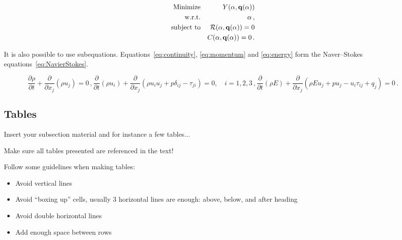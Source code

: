 \begin{eqnarray}
  {\rm Minimize}   && Y({\bf \alpha},{\bf q}({\bf \alpha}))            \nonumber           \\
  {\rm w.r.t.}     && {\bf \alpha} \,,                                 \label{eq:minimize} \\
  {\rm subject~to} && {\cal R}({\bf \alpha},{\bf q}({\bf \alpha})) = 0 \nonumber           \\
                   &&       C ({\bf \alpha},{\bf q}({\bf \alpha})) = 0 \,. \nonumber
\end{eqnarray}

It is also possible to use subequations. Equations~\ref{eq:continuity}, \ref{eq:momentum} and \ref{eq:energy} form the Naver--Stokes equations~\ref{eq:NavierStokes}.

\begin{subequations}
    \begin{equation}
    \frac{\partial \rho}{\partial t} + \frac{\partial}{\partial x_j}\left( \rho u_j \right) = 0 \,,
    \label{eq:continuity}
    \end{equation}
    \begin{equation}
    \frac{\partial}{\partial t}\left( \rho u_i \right) + \frac{\partial}{\partial x_j} \left( \rho u_i u_j + p \delta_{ij} - \tau_{ji} \right) = 0, \quad i=1,2,3 \,,
    \label{eq:momentum}
    \end{equation}
    \begin{equation}
        \frac{\partial}{\partial t}\left( \rho E \right) + \frac{\partial}{\partial x_j} \left( \rho E u_j + p u_j - u_i \tau_{ij} + q_j \right) = 0 \,.
    \label{eq:energy}
    \end{equation}
\label{eq:NavierStokes}%
\end{subequations}


\subsection{Tables}
\label{section:tables}

Insert your subsection material and for instance a few tables...

Make sure all tables presented are referenced in the text!

Follow some guidelines when making tables:

\begin{itemize}
  \item Avoid vertical lines
  \item Avoid “boxing up” cells, usually 3 horizontal lines are enough: above, below, and after heading
  \item Avoid double horizontal lines
  \item Add enough space between rows
\end{itemize}

